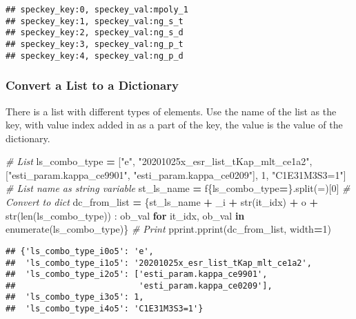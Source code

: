 \documentclass[
]{book}
\newenvironment{Shaded}{\begin{snugshade}}{\end{snugshade}}
\newcommand{\BuiltInTok}[1]{#1}
\newcommand{\CommentTok}[1]{\textcolor[rgb]{0.56,0.35,0.01}{\textit{#1}}}
\newcommand{\ControlFlowTok}[1]{\textcolor[rgb]{0.13,0.29,0.53}{\textbf{#1}}}
\newcommand{\DecValTok}[1]{\textcolor[rgb]{0.00,0.00,0.81}{#1}}
\newcommand{\KeywordTok}[1]{\textcolor[rgb]{0.13,0.29,0.53}{\textbf{#1}}}
\newcommand{\NormalTok}[1]{#1}
\newcommand{\OperatorTok}[1]{\textcolor[rgb]{0.81,0.36,0.00}{\textbf{#1}}}
\newcommand{\SpecialCharTok}[1]{\textcolor[rgb]{0.00,0.00,0.00}{#1}}
\newcommand{\SpecialStringTok}[1]{\textcolor[rgb]{0.31,0.60,0.02}{#1}}
\newcommand{\StringTok}[1]{\textcolor[rgb]{0.31,0.60,0.02}{#1}}
\begin{document}
\begin{verbatim}
## speckey_key:0, speckey_val:mpoly_1
## speckey_key:1, speckey_val:ng_s_t
## speckey_key:2, speckey_val:ng_s_d
## speckey_key:3, speckey_val:ng_p_t
## speckey_key:4, speckey_val:ng_p_d
\end{verbatim}

\hypertarget{convert-a-list-to-a-dictionary}{%
\subsubsection{Convert a List to a Dictionary}\label{convert-a-list-to-a-dictionary}}

There is a list with different types of elements. Use the name of the list as the key, with value index added in as a part of the key, the value is the value of the dictionary.

\begin{Shaded}
\begin{Highlighting}[]
\CommentTok{\# List}
\NormalTok{ls\_combo\_type }\OperatorTok{=}\NormalTok{ [}\StringTok{"e"}\NormalTok{, }\StringTok{"20201025x\_esr\_list\_tKap\_mlt\_ce1a2"}\NormalTok{, [}\StringTok{"esti\_param.kappa\_ce9901"}\NormalTok{, }\StringTok{"esti\_param.kappa\_ce0209"}\NormalTok{], }\DecValTok{1}\NormalTok{, }\StringTok{"C1E31M3S3=1"}\NormalTok{]}
\CommentTok{\# List name as string variable}
\NormalTok{st\_ls\_name }\OperatorTok{=} \SpecialStringTok{f\textquotesingle{}}\SpecialCharTok{\{}\NormalTok{ls\_combo\_type}\OperatorTok{=}\SpecialCharTok{\}}\SpecialStringTok{\textquotesingle{}}\NormalTok{.split(}\StringTok{\textquotesingle{}=\textquotesingle{}}\NormalTok{)[}\DecValTok{0}\NormalTok{]}
\CommentTok{\# Convert to dict}
\NormalTok{dc\_from\_list }\OperatorTok{=}\NormalTok{ \{st\_ls\_name }\OperatorTok{+} \StringTok{\textquotesingle{}\_i\textquotesingle{}} \OperatorTok{+} \BuiltInTok{str}\NormalTok{(it\_idx) }\OperatorTok{+} \StringTok{\textquotesingle{}o\textquotesingle{}} \OperatorTok{+} \BuiltInTok{str}\NormalTok{(}\BuiltInTok{len}\NormalTok{(ls\_combo\_type)) : ob\_val }
                \ControlFlowTok{for}\NormalTok{ it\_idx, ob\_val }\KeywordTok{in} \BuiltInTok{enumerate}\NormalTok{(ls\_combo\_type)\}}
\CommentTok{\# Print}
\NormalTok{pprint.pprint(dc\_from\_list, width}\OperatorTok{=}\DecValTok{1}\NormalTok{)}
\end{Highlighting}
\end{Shaded}

\begin{verbatim}
## {'ls_combo_type_i0o5': 'e',
##  'ls_combo_type_i1o5': '20201025x_esr_list_tKap_mlt_ce1a2',
##  'ls_combo_type_i2o5': ['esti_param.kappa_ce9901',
##                         'esti_param.kappa_ce0209'],
##  'ls_combo_type_i3o5': 1,
##  'ls_combo_type_i4o5': 'C1E31M3S3=1'}
\end{verbatim}
\end{document}
